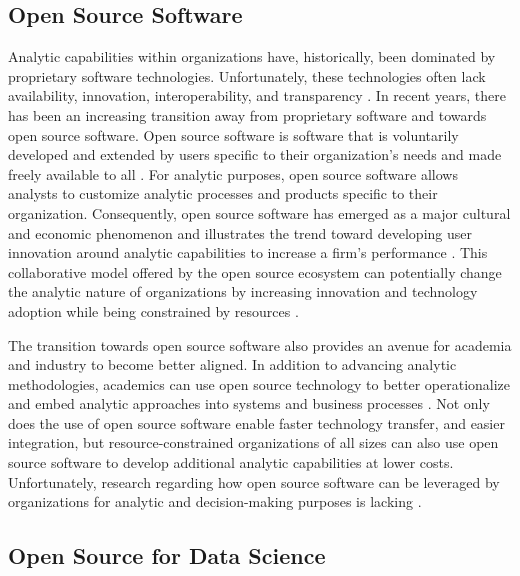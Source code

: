 \documentclass[twocolumn]{svjour3}       %
\begin{document}
\subsection{Open Source Software}
\label{sec:2.2}

Analytic capabilities within organizations have, historically, been dominated by proprietary software technologies. Unfortunately, these technologies often lack availability, innovation, interoperability, and transparency \citep{d17}.  In recent years, there has been an increasing transition away from proprietary software and towards open source software. Open source software is software that is voluntarily developed and extended by users specific to their organization's needs and made freely available to all \citep{o03}.  For analytic purposes, open source software allows analysts to customize analytic processes and products specific to their organization.  Consequently, open source software has emerged as a major cultural and economic phenomenon \citep{lt02} and illustrates the trend toward developing user innovation around analytic capabilities to increase a firm's performance \citep{h09}. This collaborative model offered by the open source ecosystem can potentially change the analytic nature of organizations by increasing innovation and technology adoption while being constrained by resources \citep{h11}.  

The transition towards open source software also provides an avenue for academia and industry to become better aligned. In addition to advancing analytic methodologies, academics can use open source technology to better operationalize and embed analytic approaches into systems and business processes \citep{ll13}.  Not only does the use of open source software enable faster technology transfer, and easier integration, but resource-constrained organizations of all sizes can also use open source software to develop additional analytic capabilities at lower costs.  Unfortunately, research regarding how open source software can be leveraged by organizations for analytic and decision-making purposes is lacking \citep{bh17}.


\subsection{Open Source for Data Science}
\label{sec:2.3}
\end{document}

